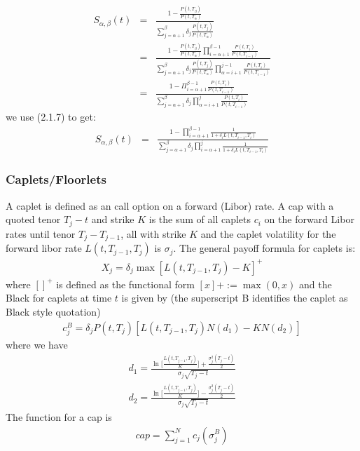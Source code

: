 \documentclass[11pt]{article}
\numberwithin{equation}{subsection}
\begin{document}
\begin{eqnarray*}
S_{\alpha, \beta}(t) &=& \frac{1- \frac{P(t, T_{\beta})}{P(t, T_{\alpha})}}{\sum_{j=\alpha+1}^{\beta} \delta_{j} \frac{P(t, T_j)}{P(t, T_{\alpha})}} \\
&=& \frac{1- \frac{P(t, T_{\beta})}{P(t, T_{\alpha})} \displaystyle \prod_{i=\alpha+1}^{\beta-1}{\frac{P(t, T_i)}{P(t, T_{i-1})}}}{\sum_{j=\alpha+1}^{\beta} \delta_{j} \frac{P(t, T_j)}{P(t, T_{\alpha})} \displaystyle \prod_{\alpha=i+1}^{j-1}{\frac{P(t, T_i)}{P(t, T_{i-1})}} }  \\
&=& \frac{1-\Pi_{i=\alpha+1}^{\beta-1}{\frac{P(t, T_i)}{P(t, T_{i-1})}}}{\sum_{j=\alpha + 1}^{\beta} \delta_j \displaystyle \prod_{\alpha=i+1}^{j}{\frac{P(t, T_i)}{P(t, T_{i-1})}}}
\end{eqnarray*}
we use (2.1.7) to get:
\begin{eqnarray}
S_{\alpha, \beta}(t) &=& \frac{1-\displaystyle \prod_{i=\alpha+1}^{\beta-1}{\frac{1}{1+\delta_i L(t, T_{i-1}, T_i)}}}{\sum_{j=\alpha + 1}^{\beta} \delta_j \displaystyle\prod_{i=\alpha+1}^{j}{\frac{1}{1 + \delta_{i} L(t, T_{i-1}, T_i)}}}
\end{eqnarray}
\subsubsection{Caplets/Floorlets}
A caplet is defined as an call option on a forward (Libor) rate. A cap with a quoted tenor \(T_{j}-t\) and strike \(K\) is the sum of all caplets \(c_i\) on the forward Libor rates until tenor \(T_{j}-T_{j-1}\), all with strike \(K\) and the caplet volatility for the forward libor rate \(L(t, T_{j-1}, T_{j})\) is \(\sigma_{j}\). The general payoff formula for caplets is:
\begin{eqnarray*}
X_j = \delta_{j} \max[L(t, T_{j-1}, T_j)-K]^{+}
\end{eqnarray*}
where \([]^+\) is defined as the functional form \([x]+ := \max(0, x)\) and the Black for caplets at time \(t\) is given by (the superscript B identifies the caplet as Black style quotation)
\begin{eqnarray}
c_j^{B} = \delta_{j} P(t, T_{j}) [L(t, T_{j-1}, T_j)N(d_1) -K N(d_2)]
\end{eqnarray}
where we have 
\begin{eqnarray}
	d_1 = \frac{\ln\bigg[\frac{L(t, T_{j-1}, T_j)}{K}\bigg]+\frac{\sigma_j^2(T_j-t)}{2}}{\sigma_j\sqrt{T_j-t}}
\end{eqnarray}
\begin{eqnarray}
	d_2 = \frac{\ln\bigg[\frac{L(t, T_{j-1}, T_j)}{K}\bigg]-\frac{\sigma_j^2(T_j-t)}{2}}{\sigma_j\sqrt{T_j-t}}
\end{eqnarray}
The function for a cap is
\begin{eqnarray}
	cap = \sum_{j=1}^{N} c_{j}(\sigma_{j}^{B})
\end{eqnarray}
\end{document}
